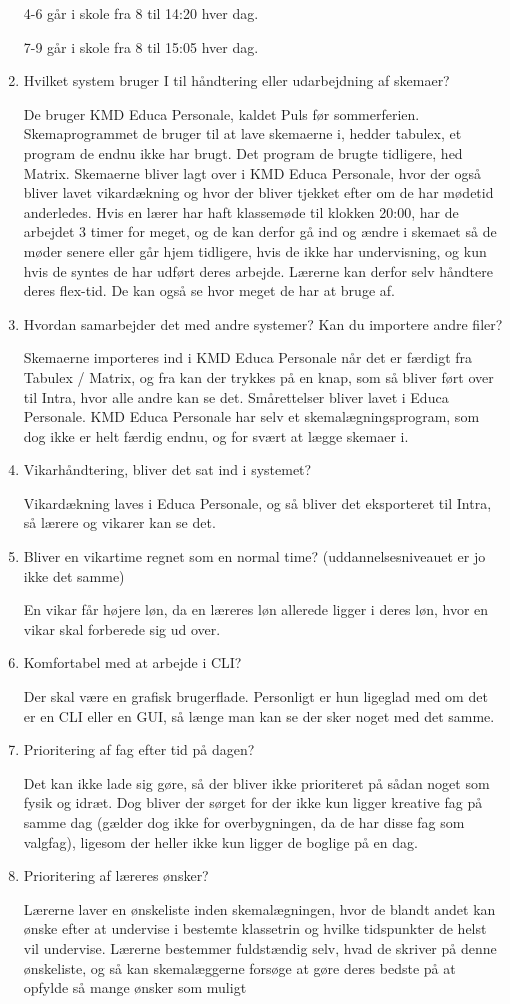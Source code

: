 \begin{enumerate}
	4-6 går i skole fra 8 til 14:20 hver dag.
	
	7-9 går i skole fra 8 til 15:05 hver dag.
	\item Hvilket system bruger I til håndtering eller udarbejdning af skemaer?
	
	De bruger KMD Educa Personale, kaldet Puls før sommerferien. Skemaprogrammet de bruger til at lave skemaerne i, hedder tabulex, et program de endnu ikke har brugt. Det program de brugte tidligere, hed Matrix.
	Skemaerne bliver lagt over i KMD Educa Personale, hvor der også bliver lavet vikardækning og hvor der bliver tjekket efter om de har mødetid anderledes. Hvis en lærer har haft klassemøde til klokken 20:00, har de arbejdet 3 timer for meget, og de kan derfor gå ind og ændre i skemaet så de møder senere eller går hjem tidligere, hvis de ikke har undervisning, og kun hvis de syntes de har udført deres arbejde. Lærerne kan derfor selv håndtere deres flex-tid. De kan også se hvor meget de har at bruge af.
	\item Hvordan samarbejder det med andre systemer? Kan du importere andre filer?
	
	Skemaerne importeres ind i KMD Educa Personale når det er færdigt fra Tabulex / Matrix, og fra kan der trykkes på en knap, som så bliver ført over til Intra, hvor alle andre kan se det. Smårettelser bliver lavet i Educa Personale.
	KMD Educa Personale har selv et skemalægningsprogram, som dog ikke er helt færdig endnu, og for svært at lægge skemaer i.
	\item Vikarhåndtering, bliver det sat ind i systemet?
	
	Vikardækning laves i Educa Personale, og så bliver det eksporteret til Intra, så lærere og vikarer kan se det.
	\item Bliver en vikartime regnet som en normal time? (uddannelsesniveauet er jo ikke det samme)
	
	En vikar får højere løn, da en læreres løn allerede ligger i deres løn, hvor en vikar skal forberede sig ud over.
	\item Komfortabel med at arbejde i CLI?
	
	Der skal være en grafisk brugerflade. Personligt er hun ligeglad med om det er en CLI eller en GUI, så længe man kan se der sker noget med det samme.
	\item Prioritering af fag efter tid på dagen?
	
	Det kan ikke lade sig gøre, så der bliver ikke prioriteret på sådan noget som fysik og idræt.
	Dog bliver der sørget for der ikke kun ligger kreative fag på samme dag (gælder dog ikke for overbygningen, da de har disse fag som valgfag), ligesom der heller ikke kun ligger de boglige på en dag.
	\item Prioritering af læreres ønsker?
	
	Lærerne laver en ønskeliste inden skemalægningen, hvor de blandt andet kan ønske efter at undervise i bestemte klassetrin og hvilke tidspunkter de helst vil undervise. Lærerne bestemmer fuldstændig selv, hvad de skriver på denne ønskeliste, og så kan skemalæggerne forsøge at gøre deres bedste på at opfylde så mange ønsker som muligt
\end{enumerate}